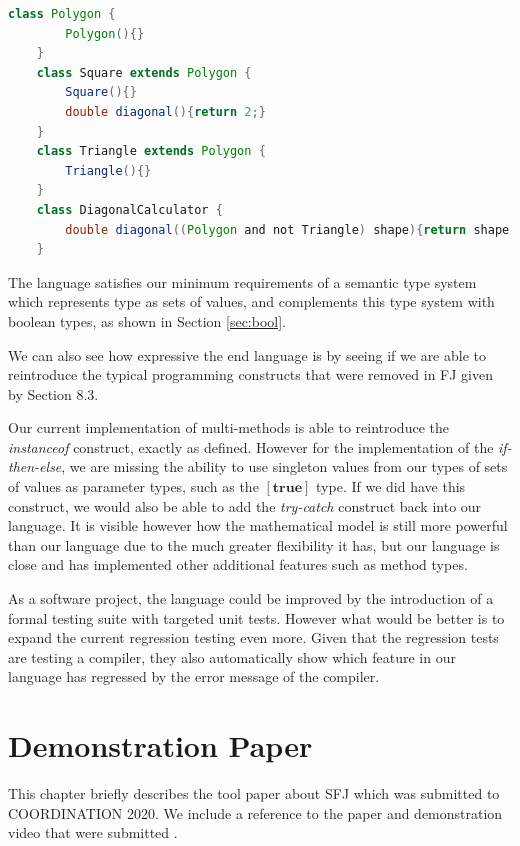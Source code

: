 \documentclass{l4proj}
\begin{document}
\begin{lstlisting}[language=Java, caption={Polygons example solution in SFJ}, label=lst:polygonsfj]
    class Polygon {
        Polygon(){}
    }
    class Square extends Polygon {
        Square(){}
        double diagonal(){return 2;}
    }
    class Triangle extends Polygon {
        Triangle(){}
    }
    class DiagonalCalculator {
        double diagonal((Polygon and not Triangle) shape){return shape.diagonal();}
    }
\end{lstlisting}

The language satisfies our minimum requirements of a semantic type system which represents type as sets of values, and complements this type system with boolean types, as shown in Section \ref{sec:bool}.

We can also see how expressive the end language is by seeing if we are able to reintroduce the typical programming constructs that were removed in FJ given by \citet{Dardha2017} Section 8.3.

Our current implementation of multi-methods is able to reintroduce the \emph{instanceof} construct, exactly as defined.
However for the implementation of the \emph{if-then-else}, we are missing the ability to use singleton values from our types of sets of values as parameter types, such as the $[\textbf{true}]$ type. If we did have this construct, we would also be able to add the \emph{try-catch} construct back into our language.
It is visible however how the mathematical model is still more powerful than our language due to the much greater flexibility it has, but our language is close and has implemented other additional features such as method types.

As a software project, the language could be improved by the introduction of a formal testing suite with targeted unit tests.
However what would be better is to expand the current regression testing even more.
Given that the regression tests are testing a compiler, they also automatically show which feature in our language has regressed by the error message of the compiler.


\chapter{Demonstration Paper}

This chapter briefly describes the tool paper about SFJ which was submitted to COORDINATION 2020.
We include a reference to the paper and demonstration video that were submitted \citep{UD20}.
\end{document}
